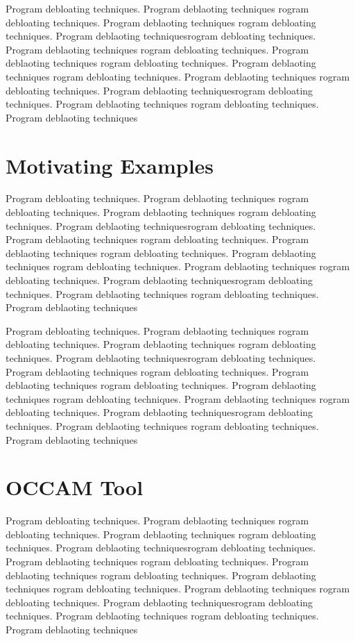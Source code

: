 \documentclass{relatorio}
\begin{document}
Program debloating techniques. Program deblaoting techniques rogram debloating techniques. Program deblaoting techniques
rogram debloating techniques. Program deblaoting techniquesrogram debloating techniques. Program deblaoting techniques
rogram debloating techniques. Program deblaoting techniques rogram debloating techniques. Program deblaoting techniques
rogram debloating techniques. Program deblaoting techniques 
rogram debloating techniques. Program deblaoting techniquesrogram debloating techniques. Program deblaoting techniques
rogram debloating techniques. Program deblaoting techniques

\section{Motivating Examples}%
\label{Tools}

Program debloating techniques. Program deblaoting techniques rogram debloating techniques. Program deblaoting techniques
rogram debloating techniques. Program deblaoting techniquesrogram debloating techniques. Program deblaoting techniques
rogram debloating techniques. Program deblaoting techniques rogram debloating techniques. Program deblaoting techniques
rogram debloating techniques. Program deblaoting techniques 
rogram debloating techniques. Program deblaoting techniquesrogram debloating techniques. Program deblaoting techniques
rogram debloating techniques. Program deblaoting techniques

Program debloating techniques. Program deblaoting techniques rogram debloating techniques. Program deblaoting techniques
rogram debloating techniques. Program deblaoting techniquesrogram debloating techniques. Program deblaoting techniques
rogram debloating techniques. Program deblaoting techniques rogram debloating techniques. Program deblaoting techniques
rogram debloating techniques. Program deblaoting techniques 
rogram debloating techniques. Program deblaoting techniquesrogram debloating techniques. Program deblaoting techniques
rogram debloating techniques. Program deblaoting techniques

\section{OCCAM Tool}%
\label{Tools}

Program debloating techniques. Program deblaoting techniques rogram debloating techniques. Program deblaoting techniques
rogram debloating techniques. Program deblaoting techniquesrogram debloating techniques. Program deblaoting techniques
rogram debloating techniques. Program deblaoting techniques rogram debloating techniques. Program deblaoting techniques
rogram debloating techniques. Program deblaoting techniques 
rogram debloating techniques. Program deblaoting techniquesrogram debloating techniques. Program deblaoting techniques
rogram debloating techniques. Program deblaoting techniques
\end{document}
